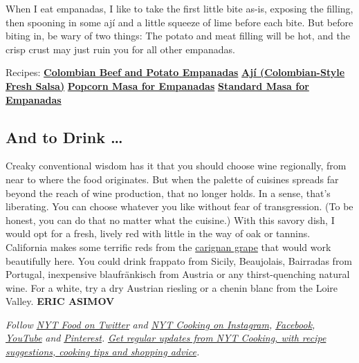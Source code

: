 When I eat empanadas, I like to take the first little bite as-is,
exposing the filling, then spooning in some ají and a little squeeze of
lime before each bite. But before biting in, be wary of two things: The
potato and meat filling will be hot, and the crisp crust may just ruin
you for all other empanadas.

Recipes:
\textbf{\href{https://cooking.nytimes.com/recipes/1021300-colombian-beef-and-potato-empanadas}{Colombian
Beef and Potato Empanadas}} \textbar{}
\textbf{\href{https://cooking.nytimes.com/recipes/1021299-aji-colombian-style-fresh-salsa}{Ají
(Colombian-Style Fresh Salsa)}} \textbar{}
\textbf{\href{https://cooking.nytimes.com/recipes/1021301-popcorn-masa-for-empanadas}{Popcorn
Masa for Empanadas}} \textbar{}
\textbf{\href{https://cooking.nytimes.com/recipes/1021302-standard-masa-for-empanadas}{Standard
Masa for Empanadas}}

\hypertarget{and-to-drink-}{%
\subsection{And to Drink \ldots{}}\label{and-to-drink-}}

Creaky conventional wisdom has it that you should choose wine
regionally, from near to where the food originates. But when the palette
of cuisines spreads far beyond the reach of wine production, that no
longer holds. In a sense, that's liberating. You can choose whatever you
like without fear of transgression. (To be honest, you can do that no
matter what the cuisine.) With this savory dish, I would opt for a
fresh, lively red with little in the way of oak or tannins. California
makes some terrific reds from the
\href{https://www.nytimes.com/2018/11/26/dining/drinks/wine-school-carignan.html}{carignan
grape} that would work beautifully here. You could drink frappato from
Sicily, Beaujolais, Bairradas from Portugal, inexpensive blaufränkisch
from Austria or any thirst-quenching natural wine. For a white, try a
dry Austrian riesling or a chenin blanc from the Loire Valley.
\textbf{ERIC ASIMOV}

\emph{Follow} \href{https://twitter.com/nytfood}{\emph{NYT Food on
Twitter}} \emph{and}
\href{https://www.instagram.com/nytcooking/}{\emph{NYT Cooking on
Instagram}}\emph{,}
\href{https://www.facebook.com/nytcooking/}{\emph{Facebook}}\emph{,}
\href{https://www.youtube.com/nytcooking}{\emph{YouTube}} \emph{and}
\href{https://www.pinterest.com/nytcooking/}{\emph{Pinterest}}\emph{.}
\href{https://www.nytimes.com/newsletters/cooking}{\emph{Get regular
updates from NYT Cooking, with recipe suggestions, cooking tips and
shopping advice}}\emph{.}

